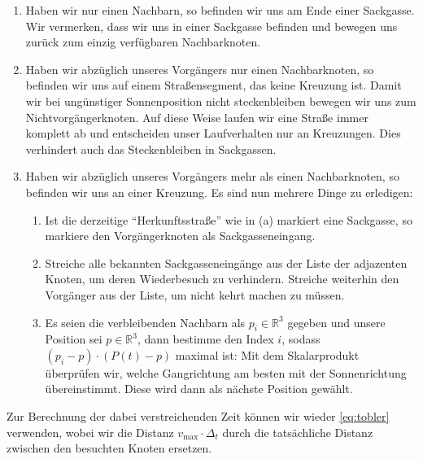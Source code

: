 \documentclass[
    paper=a4,
    DIV14,
    fontsize=12pt,
    pagesize=pdftex,
    toc=bibliographynumbered
]{scrartcl}
\numberwithin{figure}{section}
\numberwithin{equation}{section}
\numberwithin{table}{section}
\newcommand*\setR{\mathds{R}}
\begin{document}
\begin{enumerate}[label=(\alph*),leftmargin=2em]
    \item Haben wir nur einen Nachbarn, so befinden wir uns am Ende einer Sackgasse. Wir
        vermerken, dass wir uns in einer Sackgasse befinden und bewegen uns zurück zum
        einzig verfügbaren Nachbarknoten.
    \item Haben wir abzüglich unseres Vorgängers nur einen Nachbarknoten, so befinden wir
        uns auf einem Straßensegment, das keine Kreuzung ist. Damit wir bei ungünstiger
        Sonnenposition nicht steckenbleiben bewegen wir uns zum Nichtvorgängerknoten. Auf
        diese Weise laufen wir eine Straße immer komplett ab und entscheiden unser
        Laufverhalten nur an Kreuzungen. Dies verhindert auch das Steckenbleiben in
        Sackgassen.
    \item Haben wir abzüglich unseres Vorgängers mehr als einen Nachbarknoten, so befinden
        wir uns an einer Kreuzung. Es sind nun mehrere Dinge zu erledigen:
        \begin{enumerate}[label=(\roman*)]
            \item Ist die derzeitige \enquote{Herkunftsstraße} wie in (a) markiert eine
                Sackgasse, so markiere den Vorgängerknoten als Sackgasseneingang.
            \item Streiche alle bekannten Sackgasseneingänge aus der Liste der adjazenten
                Knoten, um deren Wiederbesuch zu verhindern. Streiche weiterhin den
                Vorgänger aus der Liste, um nicht kehrt machen zu müssen.
                \label{enum:streichsackg}
            \item Es seien die verbleibenden Nachbarn als $p_i \in \setR^3$ gegeben und
                unsere Position sei $p\in\setR^3$, dann bestimme den Index $i$, sodass
                $(p_i - p) \cdot (P(t) - p)$ maximal ist: Mit dem Skalarprodukt überprüfen
                wir, welche Gangrichtung am besten mit der Sonnenrichtung übereinstimmt.
                Diese wird dann als nächste Position gewählt.
        \end{enumerate}
        \label{enum:kreuz}
\end{enumerate}
Zur Berechnung der dabei verstreichenden Zeit können wir wieder \eqref{eq:tobler}
verwenden, wobei wir die Distanz $v_{\text{max}}\cdot\Delta_t$ durch die tatsächliche
Distanz zwischen den besuchten Knoten ersetzen.
\end{document}
